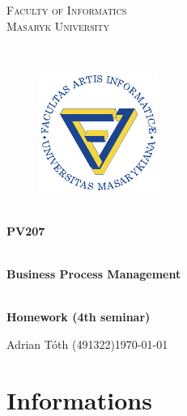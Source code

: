 \documentclass[11pt,a4paper]{article}
\begin{document}
\begin{titlepage}

    \begin{center}
        \vfill {%
            \Huge{%
                \textsc{%
                    Faculty of Informatics\\[3mm]%
                    Masaryk University%
                }%
            }%
        }%

        \hfill\\[15mm]

        \begin{figure}[!h]
            \centering
            \includegraphics[scale=3]{muni-fi-logo.pdf}
        \end{figure}

        \hfill\\[10mm]

        \Huge{
            \textbf{
                PV207
            }
        }

        \hfill\\[-10mm]

        \huge{
            \textbf{
                Business Process Management
            }
        }

        \hfill\\[10mm]

        \LARGE{
            \textbf{
                Homework (4th seminar)
            }
        }
        \vfill

    \end{center}

        \Large{
            \noindent Adrian Tóth (491322)\hfill \today
        }

\end{titlepage}

\setlength{\parskip}{0pt}
    {
        \hypersetup{
            hidelinks=true
        }
        \tableofcontents
    }
\setlength{\parskip}{0pt}

\newpage

\section{Informations}
\end{document}
